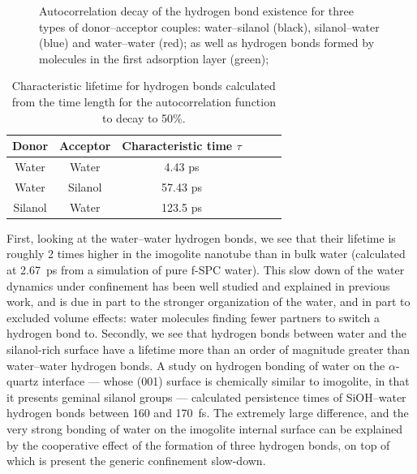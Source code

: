 \documentclass[thesis]{subfiles}
\begin{document}
\begin{figure}[ht]
    \centering
    
    \caption{Autocorrelation decay of the hydrogen bond existence for three types
    of donor--acceptor couples: water--silanol (black), silanol--water (blue) and
    water--water (red); as well as hydrogen bonds formed by molecules in the
    first adsorption layer (green);}
    \label{fig:imogolite:hbonds:lifetime}
\end{figure}

\begin{table}[ht]
    \centering
    \begin{tabular}{c c c c c c}
        \toprule
        Donor & Acceptor & Characteristic time $\tau$ \\
        \midrule
        Water & Water & 4.43 ps \\
        Water & Silanol & 57.43 ps\\
        Silanol & Water & 123.5 ps \\
        \bottomrule
    \end{tabular}
    \caption{Characteristic lifetime for hydrogen bonds calculated from the time
    length for the autocorrelation function to decay to 50\%.}
    \label{tab:imogolite:hbonds:lifetime}
\end{table}

First, looking at the water--water hydrogen bonds, we see that their lifetime is
roughly 2 times higher in the imogolite nanotube than in bulk water (calculated
at \SI{2.67}{ps} from a simulation of pure f-SPC water). This slow down of the
water dynamics under confinement has been well studied and explained in previous
work, and is due in part to the stronger organization of the water, and in part
to excluded volume effects: water molecules finding fewer partners to switch a
hydrogen bond to\cite{Fogarty2014, Fogarty2014-2}. Secondly, we see that
hydrogen bonds between water and the silanol-rich surface have a lifetime more
than an order of magnitude greater than water--water hydrogen bonds. A study on
hydrogen bonding of water on the $\alpha$-quartz interface --- whose (001)
surface is chemically similar to imogolite, in that it presents geminal silanol
groups --- calculated persistence times of SiOH--water hydrogen bonds between
160 and \SI{170}{fs}\cite{Ozkanlar2013}. The extremely large difference, and the
very strong bonding of water on the imogolite internal surface can be explained
by the cooperative effect of the formation of three hydrogen bonds, on top of
which is present the generic confinement slow-down.
\end{document}
